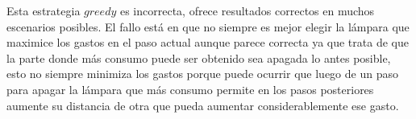 \documentclass[10pt,letterpaper]{article}
\begin{document}
{ 	Esta estrategia $greedy$ es incorrecta, ofrece resultados correctos en muchos escenarios posibles. El fallo est\'a en que no siempre es mejor elegir la l\'ampara que maximice los gastos en el paso actual aunque parece correcta ya que trata de que la parte donde m\'as consumo puede ser obtenido sea apagada lo antes posible, esto no siempre minimiza los gastos porque puede ocurrir que luego de un paso para apagar la l\'ampara que m\'as consumo permite en los pasos posteriores aumente su distancia de otra que pueda aumentar considerablemente ese gasto.\\ 
 	
 }
\end{document}
